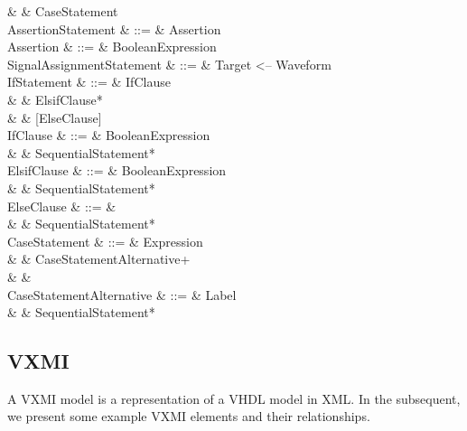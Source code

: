 \begin{VHDLcode}[\footnotesize]
                                   &       & CaseStatement \\
   AssertionStatement & ::= & \VHDLASSERT{} Assertion \\
   Assertion & ::= & BooleanExpression \\
   SignalAssignmentStatement & ::= & Target <-- Waveform \\
   IfStatement  & ::= & IfClause \\
                       &       & ElsifClause* \\
                       &       & [ElseClause] \\
   IfClause & ::= & \VHDLIF{} BooleanExpression \VHDLTHEN \\
                 &      & \VHDLTab SequentialStatement* \\
   ElsifClause & ::= & \VHDLELSIF{} BooleanExpression \VHDLTHEN \\
                     &      & \VHDLTab SequentialStatement* \\
   ElseClause & ::= & \VHDLELSE \\
                     &      & \VHDLTab SequentialStatement* \\
   CaseStatement & ::= & \VHDLCASE{} Expression \VHDLIS \\
                           &       &  \VHDLTab CaseStatementAlternative+ \\
                           &       &  \VHDLEND{} \VHDLCASE \\
   CaseStatementAlternative & ::= & \VHDLWHEN{} Label \VHDLIMPLIES \\
                                            &      &  \VHDLTab SequentialStatement* \\
\end{VHDLcode}

\subsection{VXMI}
\label{sec:vhdl-vxmi}
A VXMI model is a representation of a VHDL model in XML.  In the subsequent, we present some example VXMI elements and their relationships.


